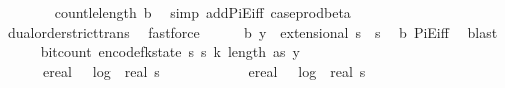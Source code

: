 \begin{isabellebody}
\ \ \ \ \ \ \isamarkupfalse%
\ count{\isacharunderscore}{\kern0pt}le{\isacharunderscore}{\kern0pt}length\ b{}\ \isamarkupfalse%
\ {\isacharparenleft}{\kern0pt}simp\ add{\isacharcolon}{\kern0pt}PiE{\isacharunderscore}{\kern0pt}iff\ case{\isacharunderscore}{\kern0pt}prod{\isacharunderscore}{\kern0pt}beta{\isacharparenright}{\kern0pt}\ \isanewline
\ \ \ \ \ \ \isamarkupfalse%
\ dual{\isacharunderscore}{\kern0pt}order{\isachardot}{\kern0pt}strict{\isacharunderscore}{\kern0pt}trans{}\ \isamarkupfalse%
\ fastforce\isanewline
\ \ \ \ \isamarkupfalse%
\ b{}{\isacharcolon}{\kern0pt}\ {\isachardoublequoteopen}y\ {\isasymin}\ extensional\ {\isacharparenleft}{\kern0pt}{\isacharbraceleft}{\kern0pt}{}{\isachardot}{\kern0pt}{\isachardot}{\kern0pt}{\isacharless}{\kern0pt}s\ {\isasymtimes}\ {\isacharbraceleft}{\kern0pt}{}{\isachardot}{\kern0pt}{\isachardot}{\kern0pt}{\isacharless}{\kern0pt}s\ \isamarkupfalse%
\ b{}\ PiE{\isacharunderscore}{\kern0pt}iff\ \isamarkupfalse%
\ blast\isanewline
\ \ \ \ \isamarkupfalse%
\ {\isachardoublequoteopen}bit{\isacharunderscore}{\kern0pt}count\ {\isacharparenleft}{\kern0pt}encode{\isacharunderscore}{\kern0pt}fk{\isacharunderscore}{\kern0pt}state\ {\isacharparenleft}{\kern0pt}s\ s\ k{\isacharcomma}{\kern0pt}\ length\ as{\isacharcomma}{\kern0pt}\ y{\isacharparenright}{\kern0pt}{\isacharparenright}{\kern0pt}\ {\isasymle}\ \isanewline
\ \ \ \ \ \ ereal\ {\isacharparenleft}{\kern0pt}{}\ {\isacharasterisk}{\kern0pt}\ log\ {}\ {\isacharparenleft}{\kern0pt}real\ s\ {\isacharplus}{\kern0pt}\ {}{\isacharparenright}{\kern0pt}\ {\isacharplus}{\kern0pt}\ {}{\isacharparenright}{\kern0pt}\ {\isacharplus}{\kern0pt}\ {\isacharparenleft}{\kern0pt}\isanewline
\ \ \ \ \ \ ereal\ {\isacharparenleft}{\kern0pt}{}\ {\isacharasterisk}{\kern0pt}\ log\ {}\ {\isacharparenleft}{\kern0pt}real\ s\ {\isacharplus}{\kern0pt}\ {}{\isacharparenright}{\kern0pt}\ {\isacharplus}{\kern0pt}\ {}{\isacharparenright}{\kern0pt}\ {\isacharplus}{\kern0pt}\ {\isacharparenleft}{\kern0pt}\ \isanewline

\end{isabellebody}
